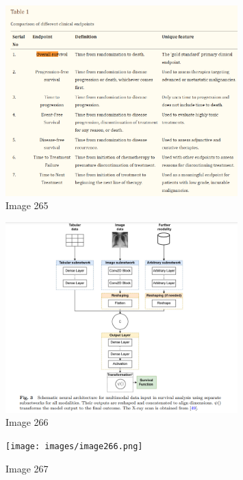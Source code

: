 \documentclass{article}%
\begin{document}
\begin{figure}[h!]%
\centering%
\includegraphics[width=0.8\textwidth]{images/image264.png}%
\caption{Image 265}%
\end{figure}

%


\begin{figure}[h!]%
\centering%
\includegraphics[width=0.8\textwidth]{images/image265.png}%
\caption{Image 266}%
\end{figure}

%


\begin{figure}[h!]%
\centering%
\texttt{[image: images/image266.png]}%
\caption{Image 267}%
\end{figure}

%
\end{document}
